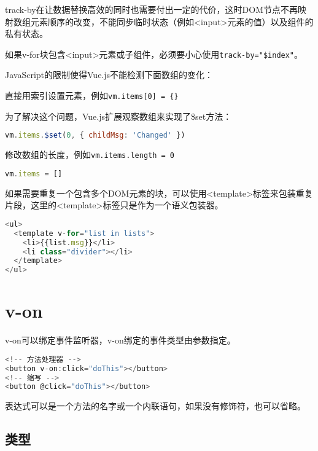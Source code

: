 track-by在让数据替换高效的同时也需要付出一定的代价，这时DOM节点不再映射数组元素顺序的改变，不能同步临时状态（例如<input>元素的值）以及组件的私有状态。


如果v-for块包含<input>元素或子组件，必须要小心使用\texttt{track-by="\$index"}。

JavaScript的限制使得Vue.js不能检测下面数组的变化：

\begin{compactitem}
\item 直接用索引设置元素，例如\texttt{vm.items[0] = \{\}}

为了解决这个问题，Vue.js扩展观察数组来实现了\$set方法：

\begin{lstlisting}[language=JavaScript]
vm.items.$set(0, { childMsg: 'Changed' })
\end{lstlisting}

\item 修改数组的长度，例如\texttt{vm.items.length = 0}

\begin{lstlisting}[language=JavaScript]
vm.items = []
\end{lstlisting}

\end{compactitem}

如果需要重复一个包含多个DOM元素的块，可以使用<template>标签来包装重复片段，这里的<template>标签只是作为一个语义包装器。

\begin{lstlisting}[language=JavaScript]
<ul>
  <template v-for="list in lists">
    <li>{{list.msg}}</li>
    <li class="divider"></li>
  </template>
</ul>
\end{lstlisting}


\section{v-on}

v-on可以绑定事件监听器，v-on绑定的事件类型由参数指定。




\begin{lstlisting}[language=JavaScript]
<!-- 方法处理器 -->
<button v-on:click="doThis"></button>
<!-- 缩写 -->
<button @click="doThis"></button>
\end{lstlisting}

表达式可以是一个方法的名字或一个内联语句，如果没有修饰符，也可以省略。

\subsection{类型}


